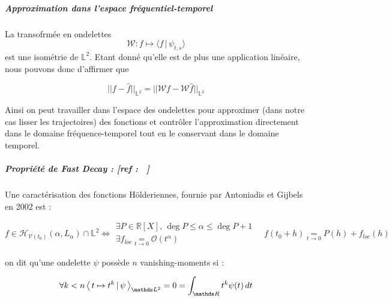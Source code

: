 \smallskip


\subparagraph{Approximation dans l'espace fréquentiel-temporel}

La transofrmée en ondelettes
\begin{equation*}
	\mathcal W : f \mapsto \langle f \, | \, \psi_{t,s} \rangle
\end{equation*}
est une isométrie de $\mathds L^2$. Etant donné qu'elle est de plus une application linéaire, nous pouvons donc d'affirmer que

\begin{equation*}
	\boxed{|| f - \hat f ||_{\mathds L^2} = || \mathcal W f - \mathcal W \hat f ||_{\mathds L^2}}
\end{equation*}

Ainsi on peut travailler dans l'espace des ondelettes pour approximer (dans notre cas lisser les trajectoires) des fonctions et contrôler l'approximation directement dans le domaine fréquence-temporel tout en le conservant dans le domaine temporel.

\subparagraph{Propriété de Fast Decay : [ref : ~\cite{mallat-wavelet-course-ens-wavelet-zoom}]}

Une caractérisation des fonctions Hölderiennes, fournie par Antoniadis et Gijbels en 2002 \citationrequise est :

\begin{equation*}
	f \in \mathcal H_{\mathcal V(t_0)}(\alpha, L_\alpha) \cap \mathds L^2 \iff
	\begin{array}{l}
		\exists P \in \mathds R[X], \, \deg P \leq \alpha \leq \deg P + 1
		\\
		\exists f_{loc} \underset{t \rightarrow 0}{=} \mathcal O(t^\alpha)
	\end{array}
	\quad f(t_0 + h) \underset{t \rightarrow 0}{=} P(h) + f_{loc}(h)
\end{equation*}

\begin{definition}
	on dit qu'une ondelette $\psi$ possède $n$ vanishing-moments si :

	\begin{equation*}
		\forall k < n \prodscalselon{t \mapsto t^k}{\psi}{\mathds L^2} = 0 = \int_{\mathds R} t^k \psi(t) \, dt
	\end{equation*}

\end{definition}

\begin{prop}

\end{prop}

